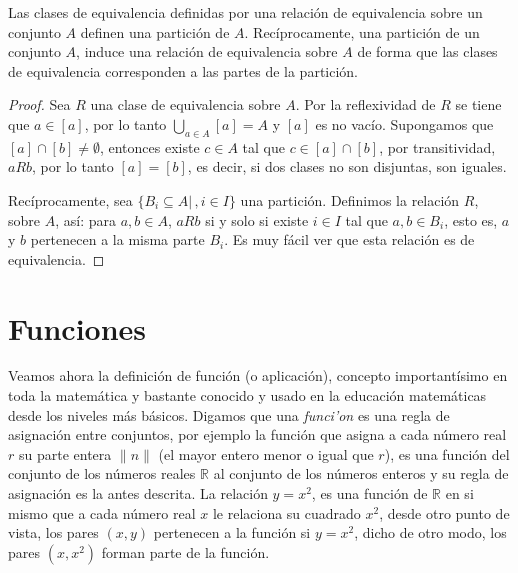 \documentclass[12pt,]{krantz}
\theoremstyle{definition}
\theoremstyle{definition}
\theoremstyle{definition}
\theoremstyle{remark}
\let\BeginKnitrBlock\begin \let\EndKnitrBlock\end
\begin{document}
\smallskip

\BeginKnitrBlock{theorem}
\protect\hypertarget{thm:unnamed-chunk-29}{}{\label{thm:unnamed-chunk-29}
}Las clases de equivalencia definidas por una relación de equivalencia
sobre un conjunto \(A\) definen una partición de \(A\). Recíprocamente,
una partición de un conjunto \(A\), induce una relación de equivalencia
sobre \(A\) de forma que las clases de equivalencia corresponden a las
partes de la partición.
\EndKnitrBlock{theorem}

\smallskip

\BeginKnitrBlock{proof}
{}Sea \(R\) una clase de equivalencia
sobre \(A\). Por la reflexividad de \(R\) se tiene que \(a\in[a]\), por
lo tanto \(\bigcup_{a\in A} [a]= A\) y \([a]\) es no vacío. Supongamos
que \([a]\cap [b]\neq\emptyset\), entonces existe \(c\in A\) tal que
\(c\in [a]\cap [b]\), por transitividad, \(aRb\), por lo tanto
\([a]=[b]\), es decir, si dos clases no son disjuntas, son iguales.

Recíprocamente, sea \(\{ B_{i}\subseteq A |\,, i\in I\}\) una partición.
Definimos la relación \(R\), sobre \(A\), así: para \(a,b\in A\),
\(aRb\) si y solo si existe \(i\in I\) tal que \(a,b\in B_{i}\), esto
es, \(a\) y \(b\) pertenecen a la misma parte \(B_{i}\). Es muy fácil
ver que esta relación es de equivalencia.
\EndKnitrBlock{proof}

\section{Funciones}\label{funciones}

\smallskip

Veamos ahora la definición de función (o aplicación), concepto
importantísimo en toda la matemática y bastante conocido y usado en la
educación matemáticas desde los niveles más básicos. Digamos que una
\emph{funci'on} es una regla de asignación entre conjuntos, por ejemplo
la función que asigna a cada número real \(r\) su parte entera
\(\lVert n \rVert\) (el mayor entero menor o igual que \(r\)), es una
función del conjunto de los números reales \(\mathbb{R}\) al conjunto de
los números enteros y su regla de asignación es la antes descrita. La
relación \(y=x^{2}\), es una función de \(\mathbb{R}\) en si mismo que a
cada número real \(x\) le relaciona su cuadrado \(x^{2}\), desde otro
punto de vista, los pares \((x,y)\) pertenecen a la función si
\(y=x^{2}\), dicho de otro modo, los pares \((x,x^{2})\) forman parte de
la función.
\end{document}
